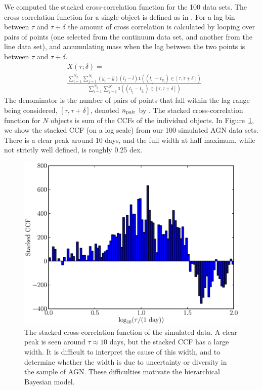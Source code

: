 \documentclass[useAMS,usenatbib]{mn2e}
\begin{document}
We computed the stacked cross-correlation function for the 100 data sets.
The cross-correlation function for a single object is defined as
in \citet{2012MNRAS.427.2701F}. For a lag bin between $\tau$ and $\tau + \delta$
the amount of cross correlation is calculated by looping over pairs of points
(one selected from the continuum data set, and another from the line data set),
and accumulating mass when the lag between the two points is between $\tau$
and $\tau + \delta$.
\begin{align}
& X(\tau; \delta) = \nonumber \\
& \frac{\sum_{i=1}^{N_y}\sum_{j=1}^{N_l}
\left(y_i - \bar{y}\right)
\left(l_j - \bar{l}\right)
\mathds{1}\left((t_{l_j} - t_{y_i}) \in [\tau, \tau + \delta]\right)}
{\sum_{i=1}^{N_y}\sum_{j=1}^{N_l}
\mathds{1}\left((t_{l_j} - t_{y_i}) \in [\tau, \tau + \delta]\right)}
\end{align}
The denominator is the number of pairs of points that fall within the lag range
being considered, $[\tau, \tau + \delta]$, denoted $n_{\rm pair}$ by
\citet{2012MNRAS.427.2701F}.
The stacked cross-correlation function for $N$ objects is sum of the CCFs
of the individual objects. In Figure~\ref{fig:ccf}, we show the stacked CCF
(on a log scale) from our 100 simulated AGN data sets.
There is a clear peak around 10 days, and the full width at half maximum,
while not strictly well defined, is roughly 0.25 dex.

\begin{figure}
\begin{center}
\includegraphics[scale=0.4]{Figures/ccf.eps}
\caption{The stacked cross-correlation function of the simulated data.
A clear peak is seen around $\tau \approx 10$ days, but the stacked CCF has a
large width. It is difficult to interpret the cause of this width, and to
determine whether the width is due to uncertainty or diversity in the sample
of AGN. These difficulties motivate the hierarchical Bayesian model.
\label{fig:ccf}}
\end{center}
\end{figure}
\end{document}
